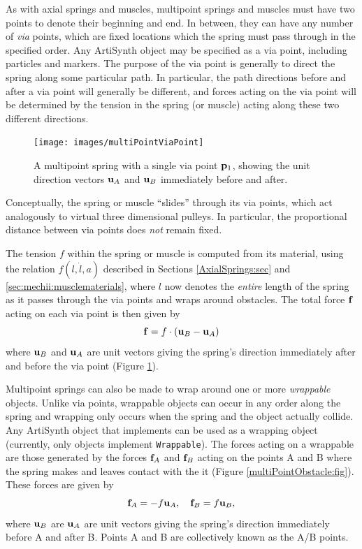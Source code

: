 As with axial springs and muscles, multipoint springs and muscles must
have two points to denote their beginning and end. In between, they can
have any number of {\it via} points, which are fixed locations which
the spring must pass through in the specified order. Any ArtiSynth
 object may be specified
as a via point, including particles and markers. The purpose of the
via point is generally to direct the spring along some particular
path. In particular, the path directions before and after a via point
will generally be different, and forces acting on the via point will
be determined by the tension in the spring (or muscle) acting along
these two different directions.

\begin{figure}[ht]
\begin{center}
 \texttt{[image: images/multiPointViaPoint]}
\end{center}
\caption{A multipoint spring with a single via point ${\bf p}_1$, showing
the unit direction vectors ${\bf u}_A$ and ${\bf u}_B$ immediately before and
after.}
\label{multiPointViaPoint:fig}
\end{figure}

\begin{sideblock}
Conceptually, the spring or muscle ``slides'' through its via points,
which act analogously to virtual three dimensional pulleys. In
particular, the proportional distance between via points does {\it not}
remain fixed.
\end{sideblock}

The tension $f$ within the spring or muscle is computed from its
material, using the relation $f(l,\dot l, a)$ described in Sections
\ref{AxialSprings:sec} and \ref{sec:mechii:musclematerials},
where $l$ now denotes the {\it entire} length of the spring
as it passes through the via points and wraps around obstacles. The
total force ${\bf f}$ acting on each via point is then given by
%
\begin{equation*}
{\bf f} = f \cdot ({\bf u}_B - {\bf u}_A)
\end{equation*}
%
where ${\bf u}_B$ and ${\bf u}_A$ are unit vectors giving the spring's direction
immediately after and before the via point
(Figure \ref{multiPointViaPoint:fig}).

Multipoint springs can also be made to wrap around one or more {\it
wrappable} objects. Unlike via points, wrappable objects can occur in
any order along the spring and wrapping only occurs when the spring
and the object actually collide. Any ArtiSynth object that implements
 can be used as a wrapping object
(currently, only  objects
implement {\tt Wrappable}).
The forces acting on a wrappable are those
generated by the forces ${\bf f}_A$ and ${\bf f}_B$ acting on the points
A and B where the spring makes and leaves contact with the
it (Figure \ref{multiPointObstacle:fig}). These forces
are given by
%
\begin{equation*}
{\bf f}_A = - f {\bf u}_A, \quad {\bf f}_B = f {\bf u}_B,
\end{equation*}
%
where ${\bf u}_B$ are ${\bf u}_A$ are unit vectors giving the spring's direction
immediately before A and after B. Points A and B are collectively
known as the A/B points.

